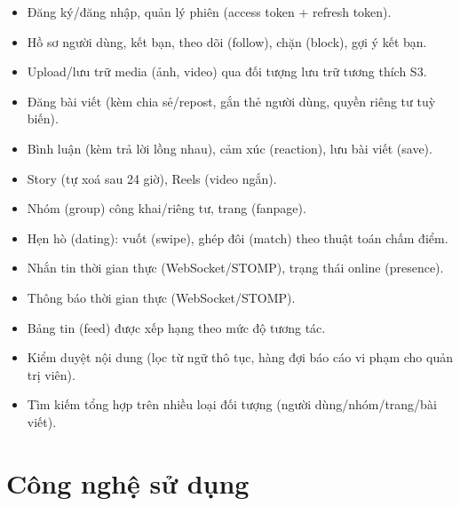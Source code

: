 \documentclass[12pt,a4paper]{report}
\begin{document}
\begin{itemize}[nosep]
    \item Đăng ký/đăng nhập, quản lý phiên (access token + refresh token).
    \item Hồ sơ người dùng, kết bạn, theo dõi (follow), chặn (block), gợi ý kết bạn.
    \item Upload/lưu trữ media (ảnh, video) qua đối tượng lưu trữ tương thích S3.
    \item Đăng bài viết (kèm chia sẻ/repost, gắn thẻ người dùng, quyền riêng tư tuỳ biến).
    \item Bình luận (kèm trả lời lồng nhau), cảm xúc (reaction), lưu bài viết (save).
    \item Story (tự xoá sau 24 giờ), Reels (video ngắn).
    \item Nhóm (group) công khai/riêng tư, trang (fanpage).
    \item Hẹn hò (dating): vuốt (swipe), ghép đôi (match) theo thuật toán chấm điểm.
    \item Nhắn tin thời gian thực (WebSocket/STOMP), trạng thái online (presence).
    \item Thông báo thời gian thực (WebSocket/STOMP).
    \item Bảng tin (feed) được xếp hạng theo mức độ tương tác.
    \item Kiểm duyệt nội dung (lọc từ ngữ thô tục, hàng đợi báo cáo vi phạm cho quản trị viên).
    \item Tìm kiếm tổng hợp trên nhiều loại đối tượng (người dùng/nhóm/trang/bài viết).
\end{itemize}

\section{Công nghệ sử dụng}
\end{document}
